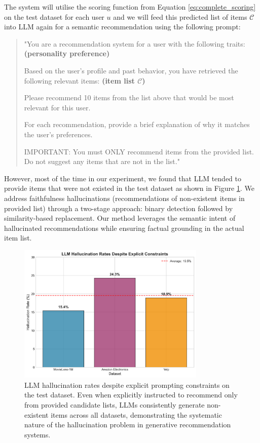 \documentclass[acmsmall]{acmart}
\begin{document}
The system will utilise the scoring function from Equation \ref{eq:complete_scoring} on the test dataset for each user $u$ and we will feed this predicted list of items $\mathcal{C}$ into LLM again for a semantic recommendation using the following prompt: 
\begin{quote}
"You are a recommendation system for a user with the following traits:
\textbf{        (personality preference)}
        
        Based on the user's profile and past behavior, you have retrieved the following relevant items:
\textbf{        (item list $\mathcal{C}$)}
        
        Please recommend 10 items from the list above that would be most relevant for this user.
        
        For each recommendation, provide a brief explanation of why it matches the user's preferences.
        
        IMPORTANT: You must ONLY recommend items from the provided list. Do not suggest any items that are not in the list."
\end{quote}
However, most of the time in our experiment, we found that LLM tended to provide items that were not existed in the test dataset as shown in Figure \ref{fig:llm_hallucination_evidence}. We address faithfulness hallucinations (recommendations of non-existent items in provided list) through a two-stage approach: binary detection followed by similarity-based replacement. Our method leverages the semantic intent of hallucinated recommendations while ensuring factual grounding in the actual item list.
\begin{figure}[h]
\centering
\includegraphics[width=0.8\textwidth]{llm_hallucination_evidence.png}
\caption{LLM hallucination rates despite explicit prompting constraints on the test dataset. Even when explicitly instructed to recommend only from provided candidate lists, LLMs consistently generate non-existent items across all datasets, demonstrating the systematic nature of the hallucination problem in generative recommendation systems.}
\label{fig:llm_hallucination_evidence}
\end{figure}
\end{document}
